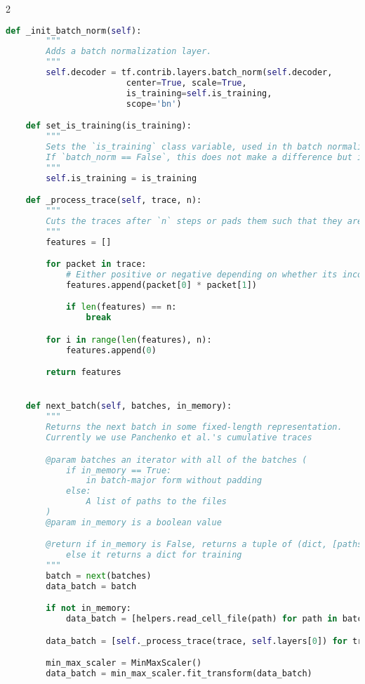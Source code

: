 \begin{landscape}
\begin{multicols}{2}
\begin{lstlisting}[language=Python]
    def _init_batch_norm(self):
        """
        Adds a batch normalization layer.
        """
        self.decoder = tf.contrib.layers.batch_norm(self.decoder,
                        center=True, scale=True,
                        is_training=self.is_training,
                        scope='bn')

    def set_is_training(is_training):
        """
        Sets the `is_training` class variable, used in th batch normalization layer.
        If `batch_norm == False`, this does not make a difference but if it is true, this variable should be set to false after training.
        """
        self.is_training = is_training

    def _process_trace(self, trace, n):
        """
        Cuts the traces after `n` steps or pads them such that they are of length `n`.
        """
        features = []

        for packet in trace:
            # Either positive or negative depending on whether its incoming or outgoing.
            features.append(packet[0] * packet[1])

            if len(features) == n:
                break

        for i in range(len(features), n):
            features.append(0)

        return features


    def next_batch(self, batches, in_memory):
        """
        Returns the next batch in some fixed-length representation.
        Currently we use Panchenko et al.'s cumulative traces

        @param batches an iterator with all of the batches (
            if in_memory == True:
                in batch-major form without padding
            else:
                A list of paths to the files
        )
        @param in_memory is a boolean value

        @return if in_memory is False, returns a tuple of (dict, [paths]) where paths is a list of paths for each batch
            else it returns a dict for training
        """
        batch = next(batches)
        data_batch = batch

        if not in_memory:
            data_batch = [helpers.read_cell_file(path) for path in batch]

        data_batch = [self._process_trace(trace, self.layers[0]) for trace in data_batch]

        min_max_scaler = MinMaxScaler()
        data_batch = min_max_scaler.fit_transform(data_batch)


\end{lstlisting}
\end{multicols}
\end{landscape}

